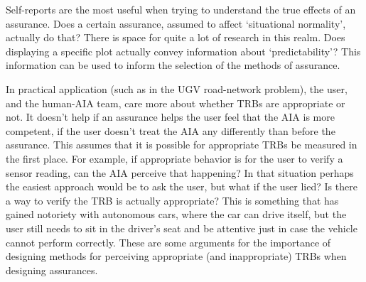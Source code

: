     Self-reports are the most useful when trying to understand the true effects of an assurance. Does a certain assurance, assumed to affect `situational normality', actually do that? There is space for quite a lot of research in this realm. Does displaying a specific plot actually convey  information about `predictability'? This information can be used to inform the selection of the methods of assurance.

    In practical application (such as in the UGV road-network problem), the user, and the human-AIA team, care more about whether TRBs are appropriate or not. It doesn't help if an assurance helps the user feel that the AIA is more competent, if the user doesn't treat the AIA any differently than before the assurance. This assumes that it is possible for appropriate TRBs be measured in the first place. For example, if appropriate behavior is for the user to verify a sensor reading, can the AIA perceive that happening? In that situation perhaps the easiest approach would be to ask the user, but what if the user lied? Is there a way to verify the TRB is actually appropriate? This is something that has gained notoriety with autonomous cars, where the car can drive itself, but the user still needs to sit in the driver's seat and be attentive just in case the vehicle cannot perform correctly. These are some arguments for the importance of designing methods for perceiving appropriate (and inappropriate) TRBs when designing assurances. 
%
%
%
